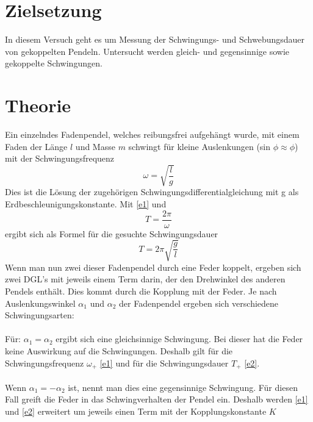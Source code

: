 \maketitle
\tableofcontents
\newpage

\section{Zielsetzung}
In diesem Versuch geht es um Messung der Schwingungs- und Schwebungsdauer von gekoppelten Pendeln.
Untersucht werden gleich- und gegensinnige sowie gekoppelte Schwingungen.
\section{Theorie}
Ein einzelndes Fadenpendel, welches reibungsfrei aufgehängt wurde, mit einem Faden der Länge $\textit{l}$ und Masse $\textit{m}$
schwingt für kleine Auslenkungen (sin $\phi \approx \phi$) mit der Schwingungsfrequenz
\begin{equation}
  \omega = \sqrt{\frac{\textit{l}}{g}}
  \label{e1}
\end{equation}
Dies ist die Lösung der zugehörigen Schwingungsdifferentialgleichung mit g als Erdbeschleunigungskonstante. Mit \eqref{e1} und
\begin{equation*}
  \textit{T} = \frac{2\pi}{\omega}
\end{equation*}
ergibt sich als Formel für die gesuchte Schwingungsdauer
\begin{equation}
  \textit{T} = 2\pi \sqrt{\frac{g}{\textit{l}}}
  \label{e2}
\end{equation}
Wenn man nun zwei dieser Fadenpendel durch eine Feder koppelt, ergeben sich zwei DGL's mit jeweils einem Term darin,
der den Drehwinkel des anderen Pendels enthält. Dies kommt durch die Kopplung mit der Feder. Je nach Auslenkungswinkel $\alpha_{1}$
und $\alpha_{2}$ der Fadenpendel ergeben sich verschiedene Schwingungsarten:
\\
\\
Für: $\alpha_{1} = \alpha_{2}$ ergibt sich eine gleichsinnige Schwingung. Bei dieser hat die Feder keine Auswirkung auf die
Schwingungen. Deshalb gilt für die Schwingungsfrequenz $\omega_{+}$ \eqref{e1} und für die Schwingungsdauer $\textit{T}_{+}$
\eqref{e2}.
\\
\\
Wenn $\alpha_{1} = -\alpha_{2}$ ist, nennt man dies eine gegensinnige Schwingung. Für diesen Fall greift die Feder in das Schwingverhalten
der Pendel ein. Deshalb werden \eqref{e1} und \eqref{e2} erweitert um jeweils einen Term mit der Kopplungskonstante $\textit{K}$
